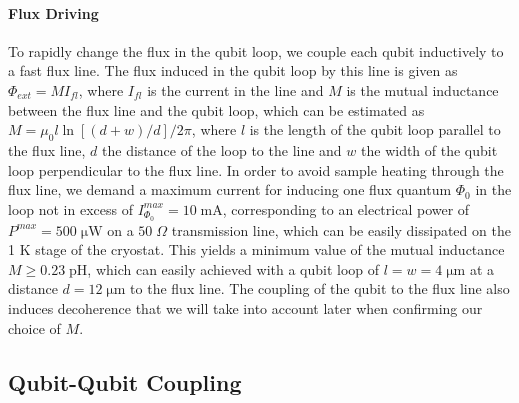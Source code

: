 \paragraph{Flux Driving}

To rapidly change the flux in the qubit loop, we couple each qubit inductively to a fast flux line. The flux induced in the qubit loop by this line is given as $\Phi_{ext}=M I_{fl}$, where $I_{fl}$ is the current in the line and $M$ is the mutual inductance between the flux line and the qubit loop, which can be estimated as $M=\mu_0 l \ln{\left[(d+w)/d\right]}/2\pi$, where $l$ is the length of the qubit loop parallel to the flux line, $d$ the distance of the loop to the line and $w$ the width of the qubit loop perpendicular to the flux line. In order to avoid sample heating through the flux line, we demand a maximum current for inducing one flux quantum $\Phi_0$ in the loop not in excess of $I_{\Phi_0}^{max}=10\;\mathrm{mA}$, corresponding to an electrical power of $P^{max}=500\;\mathrm{\mu W}$ on a $50 \; \Omega$ transmission line, which can be easily dissipated on the 1 K stage of the cryostat. This yields a minimum value of the mutual inductance $M\ge 0.23\;\mathrm{pH}$, which can easily achieved with a qubit loop of $l=w=4\;\mathrm{\mu m}$ at a distance $d=12\;\mathrm{\mu m}$ to the flux line. The coupling of the qubit to the flux line also induces decoherence that we will take into account later when confirming our choice of $M$.

\subsection{Qubit-Qubit Coupling}

